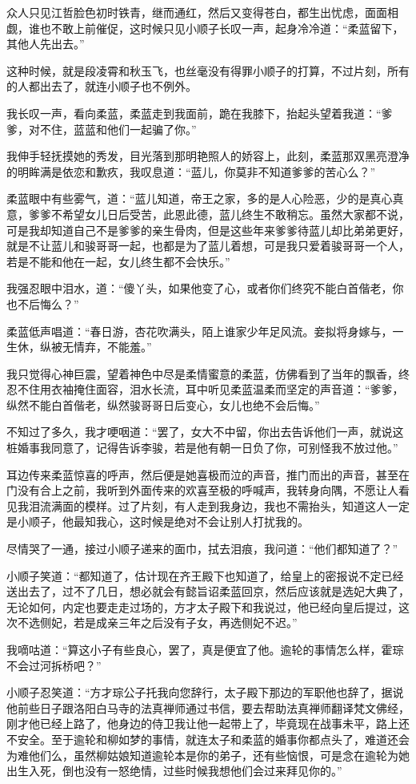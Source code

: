 众人只见江哲脸色初时铁青，继而通红，然后又变得苍白，都生出忧虑，面面相觑，谁也不敢上前催促，这时候只见小顺子长叹一声，起身冷冷道：“柔蓝留下，其他人先出去。”

这种时候，就是段凌霄和秋玉飞，也丝毫没有得罪小顺子的打算，不过片刻，所有的人都出去了，就连小顺子也不例外。

我长叹一声，看向柔蓝，柔蓝走到我面前，跪在我膝下，抬起头望着我道：“爹爹，对不住，蓝蓝和他们一起骗了你。”

我伸手轻抚摸她的秀发，目光落到那明艳照人的娇容上，此刻，柔蓝那双黑亮澄净的明眸满是依恋和歉疚，我叹息道：“蓝儿，你莫非不知道爹爹的苦心么？”

柔蓝眼中有些雾气，道：“蓝儿知道，帝王之家，多的是人心险恶，少的是真心真意，爹爹不希望女儿日后受苦，此恩此德，蓝儿终生不敢稍忘。虽然大家都不说，可是我却知道自己不是爹爹的亲生骨肉，但是这些年来爹爹待蓝儿却比弟弟更好，就是不让蓝儿和骏哥哥一起，也都是为了蓝儿着想，可是我只爱着骏哥哥一个人，若是不能和他在一起，女儿终生都不会快乐。”

我强忍眼中泪水，道：“傻丫头，如果他变了心，或者你们终究不能白首偕老，你也不后悔么？”

柔蓝低声唱道：“春日游，杏花吹满头，陌上谁家少年足风流。妾拟将身嫁与，一生休，纵被无情弃，不能羞。”

我只觉得心神巨震，望着神色中尽是柔情蜜意的柔蓝，仿佛看到了当年的飘香，终忍不住用衣袖掩住面容，泪水长流，耳中听见柔蓝温柔而坚定的声音道：“爹爹，纵然不能白首偕老，纵然骏哥哥日后变心，女儿也绝不会后悔。”

不知过了多久，我才哽咽道：“罢了，女大不中留，你出去告诉他们一声，就说这桩婚事我同意了，记得告诉李骏，若是他有朝一日负了你，可别怪我不放过他。”

耳边传来柔蓝惊喜的呼声，然后便是她喜极而泣的声音，推门而出的声音，甚至在门没有合上之前，我听到外面传来的欢喜至极的呼喊声，我转身向隅，不愿让人看见我泪流满面的模样。过了片刻，有人走到我身边，我也不需抬头，知道这人一定是小顺子，他最知我心，这时候是绝对不会让别人打扰我的。

尽情哭了一通，接过小顺子递来的面巾，拭去泪痕，我问道：“他们都知道了？”

小顺子笑道：“都知道了，估计现在齐王殿下也知道了，给皇上的密报说不定已经送出去了，过不了几日，想必就会有懿旨诏柔蓝回京，然后应该就是选妃大典了，无论如何，内定也要走走过场的，方才太子殿下和我说过，他已经向皇后提过，这次不选侧妃，若是成亲三年之后没有子女，再选侧妃不迟。”

我嘀咕道：“算这小子有些良心，罢了，真是便宜了他。逾轮的事情怎么样，霍琮不会过河拆桥吧？”

小顺子忍笑道：“方才琮公子托我向您辞行，太子殿下那边的军职他也辞了，据说他前些日子跟洛阳白马寺的法真禅师通过书信，要去帮助法真禅师翻译梵文佛经，刚才他已经上路了，他身边的侍卫我让他一起带上了，毕竟现在战事未平，路上还不安全。至于逾轮和柳如梦的事情，就连太子和柔蓝的婚事你都点头了，难道还会为难他们么，虽然柳姑娘知道逾轮本是你的弟子，还有些恼恨，可是念在逾轮为她出生入死，倒也没有一怒绝情，过些时候我想他们会过来拜见你的。”

